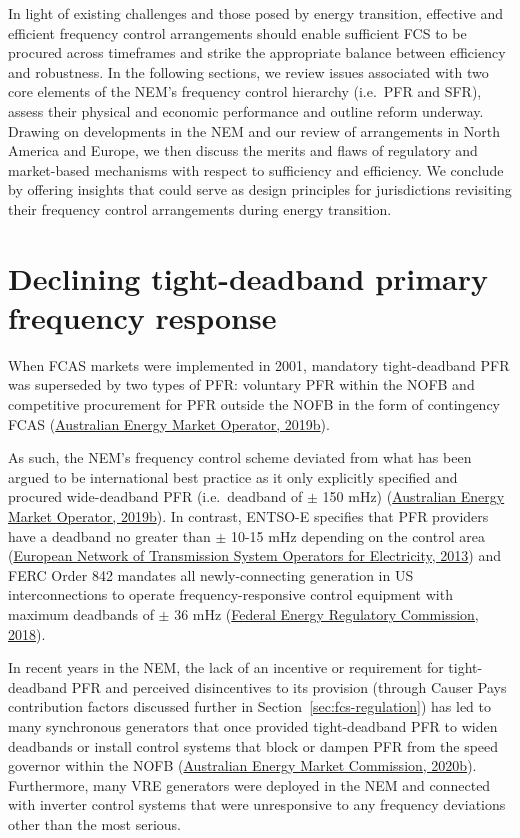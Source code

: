 \documentclass[12pt,a4paper,]{report}
\begin{document}
In light of existing challenges and those posed by energy transition,
effective and efficient frequency control arrangements should enable
sufficient FCS to be procured across timeframes and strike the
appropriate balance between efficiency and robustness. In the following
sections, we review issues associated with two core elements of the
NEM's frequency control hierarchy (i.e.~PFR and SFR), assess their
physical and economic performance and outline reform underway. Drawing
on developments in the NEM and our review of arrangements in North
America and Europe, we then discuss the merits and flaws of regulatory
and market-based mechanisms with respect to sufficiency and efficiency.
We conclude by offering insights that could serve as design principles
for jurisdictions revisiting their frequency control arrangements during
energy transition.

\hypertarget{sec:fcs-pfr}{%
\section{Declining tight-deadband primary frequency
response}\label{sec:fcs-pfr}}

When FCAS markets were implemented in 2001, mandatory tight-deadband PFR
was superseded by two types of PFR: voluntary PFR within the NOFB and
competitive procurement for PFR outside the NOFB in the form of
contingency FCAS
(\protect\hyperlink{ref-australianenergymarketoperatorElectricityRuleChange2019}{Australian
Energy Market Operator, 2019b}).

As such, the NEM's frequency control scheme deviated from what has been
argued to be international best practice as it only explicitly specified
and procured wide-deadband PFR (i.e.~deadband of \(\pm\) 150 mHz)
(\protect\hyperlink{ref-australianenergymarketoperatorElectricityRuleChange2019}{Australian
Energy Market Operator, 2019b}). In contrast, ENTSO-E specifies that PFR
providers have a deadband no greater than \(\pm\) 10-15 mHz depending on
the control area
(\protect\hyperlink{ref-europeannetworkoftransmissionsystemoperatorsforelectricityentso-eNetworkCodeLoadFrequency2013}{European
Network of Transmission System Operators for Electricity, 2013}) and
FERC Order 842 mandates all newly-connecting generation in US
interconnections to operate frequency-responsive control equipment with
maximum deadbands of \(\pm\) 36 mHz
(\protect\hyperlink{ref-federalenergyregulatorycommissionfercOrderNo8422018}{Federal
Energy Regulatory Commission, 2018}).

In recent years in the NEM, the lack of an incentive or requirement for
tight-deadband PFR and perceived disincentives to its provision (through
Causer Pays contribution factors discussed further in
Section~\ref{sec:fcs-regulation}) has led to many synchronous generators
that once provided tight-deadband PFR to widen deadbands or install
control systems that block or dampen PFR from the speed governor within
the NOFB
(\protect\hyperlink{ref-australianenergymarketcommissionMandatoryPrimaryFrequency2020}{Australian
Energy Market Commission, 2020b}). Furthermore, many VRE generators were
deployed in the NEM and connected with inverter control systems that
were unresponsive to any frequency deviations other than the most
serious.
\end{document}
